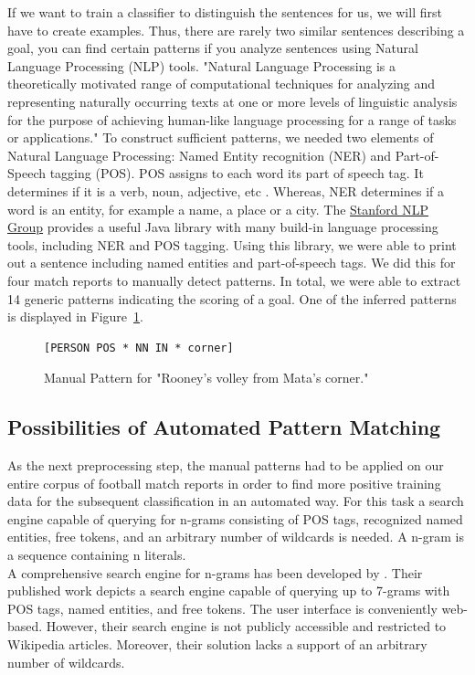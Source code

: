 \documentclass[11pt,titlepage,oneside,openany]{book}
\begin{document}
If we want to train a classifier to distinguish the sentences for us, we will first have to create examples. Thus, there are rarely two similar sentences describing a goal, you can find certain patterns if you analyze sentences using Natural Language Processing (NLP) tools. "Natural Language Processing is a theoretically motivated range of computational techniques for analyzing and representing naturally occurring texts at one or more levels of linguistic analysis for the purpose of achieving human-like language processing for a range of tasks or applications." \citep[p.1]{Liddy2001} To construct sufficient patterns, we needed two elements of Natural Language Processing: Named Entity recognition (NER) and Part-of-Speech tagging (POS). POS assigns to each word its part of speech tag. It determines if it is a verb, noun, adjective, etc \citep[p.219]{Voutilainen2005}. Whereas, NER determines if a word is an entity, for example a name, a place or a city.  
The \hyperlink{http://nlp.stanford.edu/software/CRF-NER.shtml}{Stanford NLP Group} provides a useful Java library with many build-in language processing tools, including NER and POS tagging. Using this library, we were able to print out a sentence including named entities and part-of-speech tags. We did this for four match reports to manually detect patterns. In total, we were able to extract 14 generic patterns indicating the scoring of a goal. One of the inferred patterns is displayed in Figure~\ref{fig.manualpattern}. \\
\begin{figure} [h!]
\centering
\begin{lstlisting}[frame=single]
[PERSON POS * NN IN * corner]
\end{lstlisting}
\caption{Manual Pattern for "Rooney's volley from Mata's corner."}
\label{fig.manualpattern}
\end{figure}

\subsection{Possibilities of Automated Pattern Matching}
\label{sec:automatch}
As the next preprocessing step, the manual patterns had to be applied on our entire corpus of football match reports in order to find more positive training data for the subsequent classification in an automated way. For this task a search engine capable of querying for n-grams consisting of POS tags, recognized named entities, free tokens, and an arbitrary number of wildcards is needed. A n-gram is a sequence containing n literals.\\
A comprehensive search engine for n-grams has been developed by \citeauthor*{Sekine2010} \citeyearpar{Sekine2010}. Their published work depicts a search engine capable of querying up to 7-grams with POS tags, named entities, and free tokens. The user interface is conveniently web-based. However, their search engine is not publicly accessible and restricted to Wikipedia articles. Moreover, their solution lacks a support of an arbitrary number of wildcards.\\
\end{document}
